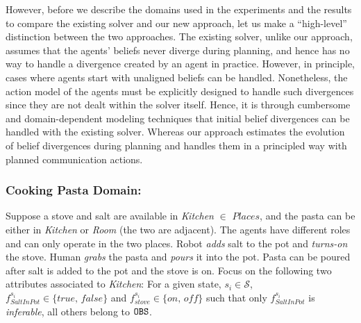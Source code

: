 \documentclass[letterpaper]{article} %
\begin{document}
However, before we describe the domains used in the experiments and the results to compare the existing solver and our new approach, let us make a ``high-level'' distinction between the two approaches. 
The existing solver, unlike our approach, assumes that the agents' beliefs never diverge during planning, and hence has no way to handle a divergence created by an agent in practice. However, in principle, cases where agents start with unaligned beliefs can be handled. Nonetheless, the action model of the agents must be explicitly designed to handle such divergences since they are not dealt within the solver itself. Hence, it is through cumbersome and domain-dependent modeling techniques that initial belief divergences can be handled with the existing solver.
Whereas our approach estimates the evolution of belief divergences during planning and handles them in a principled way with planned communication actions.

\subsubsection{Cooking Pasta Domain:}
Suppose a stove and salt are available in \textit{Kitchen} $\in$ $\textit{Places}$, and the pasta can be either in \textit{Kitchen} or \textit{Room} (the two are adjacent). The agents have different roles and can only operate in the two places. Robot \textit{adds} salt to the pot and \textit{turns-on} the stove. Human \textit{grabs} the pasta and \textit{pours} it into the pot. 
Pasta can be poured after salt is added to the pot and the stove is {\sc on}.
Focus on the following two attributes associated to \textit{Kitchen}: For a given state, $s_i \in \mathcal{S}$, $f_{\textit{SaltInPot}}^{s_i} \in \{\textit{true, false}\}$ and $f_{\textit{stove}}^{s_i} \in \{\textit{on, off}\}$ such that only $f_{\textit{SaltInPot}}^{s_i}$ is \textit{inferable}, all others belong to $\texttt{OBS}$.
\end{document}
